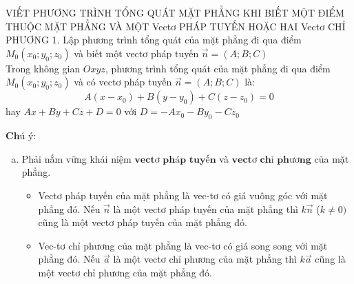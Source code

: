 \begin{dang}{VIẾT PHƯƠNG TRÌNH TỔNG QUÁT MẶT PHẲNG KHI BIẾT MỘT ĐIỂM THUỘC MẶT PHẲNG VÀ MỘT Vectơ PHÁP TUYẾN HOẶC HAI Vectơ CHỈ PHƯƠNG}
1. Lập phương trình tổng quát của mặt phẳng đi qua điểm $M_0 \left(x_0;y_0;z_0\right)$ và biết một vectơ pháp tuyến $\overrightarrow{n} = \left(A;B;C\right)$\\
Trong không gian $Oxyz$, phương trình tổng quát của mặt phẳng đi qua điểm $M_0 \left(x_0;y_0;z_0\right)$ và có vectơ pháp tuyến $\overrightarrow{n}= \left(A;B;C\right)$ là:\\
$$A\left(x-x_0\right) + B\left(y-y_0\right)+C\left(z-z_0\right) = 0$$
hay $Ax+By+Cz+D=0$ với $D= -Ax_0-By_0-Cz_0$
\begin{center}
\end{center}
$\textbf{Chú ý:}$
\begin{enumerate}[a.]
\item Phải nắm vững khái niệm $\textbf{vectơ pháp tuyến}$ và $\textbf{vectơ chỉ phương}$ của mặt phẳng.
\begin{itemize}
\item Vectơ pháp tuyến của mặt phẳng là vec-tơ có giá vuông góc với mặt phẳng đó. Nếu $\overrightarrow{n}$ là một vectơ pháp tuyến của mặt phẳng thì $k\overrightarrow{n}$ ($k \neq 0)$ cũng là một vectơ pháp tuyến của mặt phẳng đó.
\item Vec-tơ chỉ phương của mặt phẳng là vec-tơ có giá song song với mặt phẳng đó. Nếu $\overrightarrow{a}$ là một vectơ chỉ phương của mặt phẳng thì $k\overrightarrow{a}$ cũng là một vectơ chỉ phương của mặt phẳng đó.
\end{itemize}

\end{enumerate}
\end{dang}
